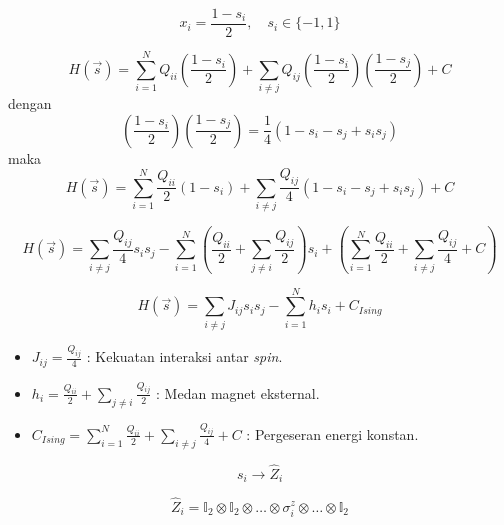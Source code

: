 \begin{equation}
    x_i = \frac{1 - s_i}{2}, \quad s_i \in \{-1, 1\}
\end{equation}

\begin{equation}
    H(\vec{s}) = \sum_{i=1}^N Q_{ii} \left( \frac{1 - s_i}{2} \right) + \sum_{i \ne j} Q_{ij} \left( \frac{1 - s_i}{2} \right) \left( \frac{1 - s_j}{2} \right) + C
\end{equation}
 dengan 
\begin{equation}
    \left( \frac{1 - s_i}{2} \right) \left( \frac{1 - s_j}{2} \right) = \frac{1}{4} (1 - s_i - s_j + s_i s_j)
\end{equation}
maka
\begin{equation}
    H(\vec{s}) = \sum_{i=1}^N \frac{Q_{ii}}{2} (1 - s_i) + \sum_{i \ne j} \frac{Q_{ij}}{4} (1 - s_i - s_j + s_i s_j) + C
\end{equation}

\begin{equation}
    H(\vec{s}) = \sum_{i \ne j} \frac{Q_{ij}}{4} s_i s_j - \sum_{i=1}^N \left( \frac{Q_{ii}}{2} + \sum_{j \ne i} \frac{Q_{ij}}{2} \right) s_i + \left( \sum_{i=1}^N \frac{Q_{ii}}{2} + \sum_{i \ne j} \frac{Q_{ij}}{4} + C \right)
\end{equation}

\begin{equation}
    H(\vec{s}) = \sum_{i \ne j} J_{ij} s_i s_j - \sum_{i=1}^N h_i s_i + C_{Ising}
\end{equation}

\begin{itemize}
    \item $J_{ij} = \frac{Q_{ij}}{4}$ : Kekuatan interaksi antar \textit{spin}.
    \item $h_i = \frac{Q_{ii}}{2} + \sum_{j \ne i} \frac{Q_{ij}}{2}$ : Medan magnet eksternal.
    \item $C_{Ising} = \sum_{i=1}^N \frac{Q_{ii}}{2} + \sum_{i \ne j} \frac{Q_{ij}}{4} + C$ : Pergeseran energi konstan.
\end{itemize}

\begin{equation}
    s_i \to \hat{Z}_i
\end{equation}

\begin{equation}
    \hat{Z}_i = \mathbb{I}_2 \otimes \mathbb{I}_2 \otimes \dots \otimes \sigma^z_i \otimes \dots \otimes \mathbb{I}_2
\end{equation}

